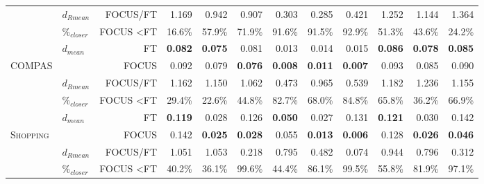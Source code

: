 \begin{tabular}{llrrrrrrrrrr}
                 &     $d_{Rmean}$               & FOCUS/FT           & 1.169  & 0.942  & 0.907  & 0.303  & 0.285  & 0.421  & 1.252  & 1.144  & 1.364  \\ 
                 &     $\mathit{\%_{closer}}$               & FOCUS \textless FT & 16.6\% & 57.9\% & 71.9\% & 91.6\% & 91.5\% & 92.9\% & 51.3\% & 43.6\% & 24.2\%          \\
 
 \midrule
 
 
 
 

                 &      	$d_{mean}$              & FT               & \textbf{0.082} & \textbf{0.075} & 0.081 & 0.013 & 0.014 & 0.015 & \textbf{0.086} & \textbf{0.078} & \textbf{0.085} \\
  \textsc{COMPAS}               &              & FOCUS              & 0.092\rlap{\dubbelop} & 0.079\rlap{\notsig} & \textbf{0.076}\rlap{\dubbelneer} & \textbf{0.008}\rlap{\dubbelneer} & \textbf{0.011}\rlap{\dubbelneer} & \textbf{0.007}\rlap{\dubbelneer} & 0.093\rlap{\dubbelop} & 0.085\rlap{\notsig} & 0.090\rlap{\notsig} \\
\cmidrule{2-12}
                 &      $d_{Rmean}$              & FOCUS/FT           & 1.162 & 1.150 & 1.062 & 0.473 & 0.965 & 0.539 & 1.182 & 1.236 & 1.155 \\ 
                 &      $\mathit{\%_{closer}}$              & FOCUS \textless FT & 29.4\% & 22.6\% & 44.8\% & 82.7\% & 68.0\% & 84.8\% & 65.8\% & 36.2\% & 66.9\% \\
\midrule






                 &      	$d_{mean}$              & FT                & \textbf{0.119}  & 0.028  & 0.126\rlap\NoExample  & \textbf{0.050}  & 0.027  & 0.131\rlap\NoExample  & \textbf{0.121}  & 0.030  & 0.142\rlap\NoExample  \\
   \textsc{Shopping}              &              & FOCUS              & 0.142\rlap{\dubbelop}  & \textbf{0.025}\rlap{\dubbelneer}  & \textbf{0.028}\rlap{\dubbelneer}  & 0.055\rlap{\dubbelop}  & \textbf{0.013}\rlap{\dubbelneer}  & \textbf{0.006}\rlap{\dubbelneer}  & 0.128\rlap{\notsig}  & \textbf{0.026}\rlap{\dubbelneer}  & \textbf{0.046}\rlap{\dubbelneer}  \\ 
\cmidrule{2-12}
                 &      $d_{Rmean}$              & FOCUS/FT           & 1.051  & 1.053  & 0.218  & 0.795  & 0.482  & 0.074  & 0.944  & 0.796  & 0.312  \\ 
                 &    $\mathit{\%_{closer}}$                & FOCUS \textless FT & 40.2\% & 36.1\% & 99.6\% & 44.4\% & 86.1\% & 99.5\% & 55.8\% & 81.9\% & 97.1\% \\




 \bottomrule                
\end{tabular}
